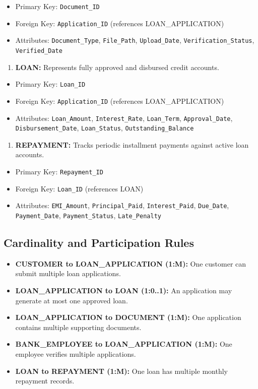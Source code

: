 \documentclass[12pt,a4paper,oneside]{report}
\begin{document}
\begin{itemize}
  \item Primary Key: \texttt{Document\_ID}
  \item Foreign Key: \texttt{Application\_ID} (references LOAN\_APPLICATION)
  \item Attributes: \texttt{Document\_Type}, \texttt{File\_Path}, \texttt{Upload\_Date}, \texttt{Verification\_Status}, \texttt{Verified\_Date}
\end{itemize}

\begin{enumerate}
  \item \textbf{LOAN:} Represents fully approved and disbursed credit accounts.
\end{enumerate}

\begin{itemize}
  \item Primary Key: \texttt{Loan\_ID}
  \item Foreign Key: \texttt{Application\_ID} (references LOAN\_APPLICATION)
  \item Attributes: \texttt{Loan\_Amount}, \texttt{Interest\_Rate}, \texttt{Loan\_Term}, \texttt{Approval\_Date}, \texttt{Disbursement\_Date}, \texttt{Loan\_Status}, \texttt{Outstanding\_Balance}
\end{itemize}

\begin{enumerate}
  \item \textbf{REPAYMENT:} Tracks periodic installment payments against active loan accounts.
\end{enumerate}

\begin{itemize}
  \item Primary Key: \texttt{Repayment\_ID}
  \item Foreign Key: \texttt{Loan\_ID} (references LOAN)
  \item Attributes: \texttt{EMI\_Amount}, \texttt{Principal\_Paid}, \texttt{Interest\_Paid}, \texttt{Due\_Date}, \texttt{Payment\_Date}, \texttt{Payment\_Status}, \texttt{Late\_Penalty}
\end{itemize}

\subsection{Cardinality and Participation Rules}

\begin{itemize}
  \item \textbf{CUSTOMER to LOAN\_APPLICATION (1:M):} One customer can submit multiple loan applications.
  \item \textbf{LOAN\_APPLICATION to LOAN (1:0..1):} An application may generate at most one approved loan.
  \item \textbf{LOAN\_APPLICATION to DOCUMENT (1:M):} One application contains multiple supporting documents.
  \item \textbf{BANK\_EMPLOYEE to LOAN\_APPLICATION (1:M):} One employee verifies multiple applications.
  \item \textbf{LOAN to REPAYMENT (1:M):} One loan has multiple monthly repayment records.
\end{itemize}
\end{document}
